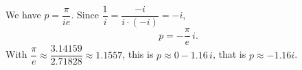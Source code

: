 We have $p=\dfrac{\pi}{ie}$. Since $\dfrac{1}{i}=\dfrac{-i}{i\cdot(-i)}=-i$,
\[
p=-\dfrac{\pi}{e}\,i .
\]
With $\dfrac{\pi}{e}\approx\dfrac{3.14159}{2.71828}\approx1.1557$, this is $p\approx\boxed{0-1.16\,i}$, that is $p\approx-1.16i$.
